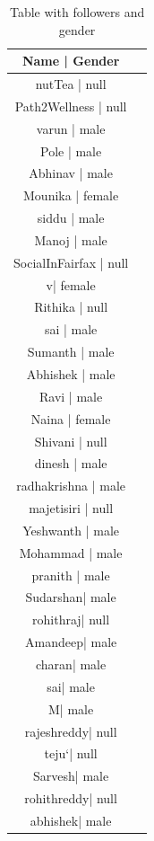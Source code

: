 \documentclass[12pt]{article}
\begin{document}
\begin{table}

\caption{Table with followers and gender}
\label{Table:q1table1}
\begin{center}
\begin{tabular}{| c | c |}
\hline

 Name | Gender\\ \hline
 nutTea  | null\\ \hline		
 Path2Wellness  | null\\ \hline		
 varun  | male\\ \hline		
 Pole | male\\ \hline		
 Abhinav  | male\\ \hline
 Mounika  | female\\ \hline	
 siddu    | male\\ \hline
 Manoj | male\\ \hline
 SocialInFairfax  | null\\ \hline	
 v| female\\ \hline
 Rithika  | null\\ \hline	
 sai | male\\ \hline
 Sumanth  | male\\ \hline	
 Abhishek  | male\\ \hline
 Ravi | male\\ \hline
 Naina | female\\ \hline	
 Shivani | null\\ \hline
 dinesh   | male\\ \hline	
 radhakrishna | male\\ \hline
 majetisiri  | null\\ \hline	
 Yeshwanth  | male\\ \hline
 Mohammad  | male\\ \hline
 pranith  | male\\ \hline
Sudarshan| 		male\\ \hline		
rohithraj|	null\\ \hline		
Amandeep| 	male\\ \hline		
charan|	male\\ \hline		
sai| 		male\\ \hline
M|		male\\ \hline	
rajeshreddy| 	null\\ \hline
teju`| 	null\\ \hline
Sarvesh| 		male\\ \hline	
rohithreddy| 		null\\ \hline
abhishek| 		male\\ \hline	


                
\end{tabular}
\end{center}
\end{table}
\end{document}
